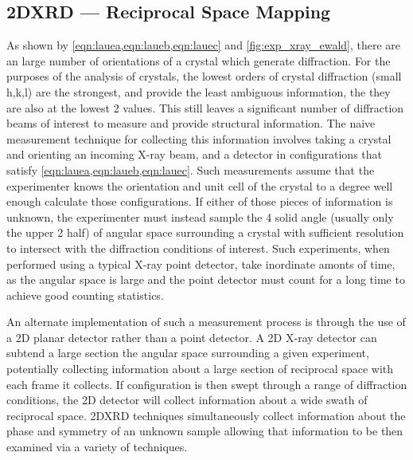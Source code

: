 \subsection{2DXRD --- Reciprocal Space Mapping}
\label{sec:2DXRD}
As shown by \cref{eqn:lauea,eqn:laueb,eqn:lauec} and \cref{fig:exp_xray_ewald}, there are an large number of orientations of a crystal which generate diffraction.
For the purposes of the analysis of crystals, the lowest orders of crystal diffraction (small h,k,l) are the strongest, and provide the least ambiguous information, the they are also at the lowest 2\straighttheta{} values.
This still leaves a significant number of diffraction beams of interest to measure and provide structural information.
The naive measurement technique for collecting this information involves taking a crystal and orienting an incoming X-ray beam, and a detector in configurations that satisfy \cref{eqn:lauea,eqn:laueb,eqn:lauec}.
Such measurements assume that the experimenter knows the orientation and unit cell of the crystal to a degree well enough calculate those configurations.
If either of those pieces of information is unknown, the experimenter must instead sample the 4\textpi{} solid angle (usually only the upper 2\textpi{} half) of angular space surrounding a crystal with sufficient resolution to intersect with the diffraction conditions of interest.
Such experiments, when performed using a typical X-ray point detector, take inordinate amonts of time, as the angular space is large and the point detector must count for a long time to achieve good counting statistics.

An alternate implementation of such a measurement process is through the use of a 2D planar detector rather than a point detector.
A 2D X-ray detector can subtend a large section the angular space surrounding a given experiment, potentially collecting information about a large section of reciprocal space with each frame it collects.
If configuration is then swept through a range of diffraction conditions, the 2D detector will collect information about a wide swath of reciprocal space.
2DXRD techniques simultaneously collect information about the phase and symmetry of an unknown sample allowing that information to be then examined via a variety of techniques.

